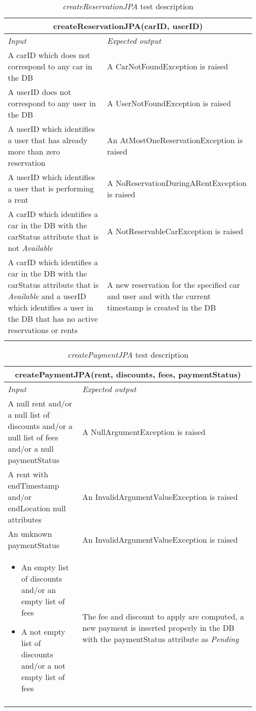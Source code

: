 \begin{longtable}{p{0.4\linewidth}p{0.6\linewidth}}
\multicolumn{2}{c}{\textbf{createReservationJPA(carID, userID)}} \\
\toprule
\emph{Input} & \emph{Expected output} \\
\midrule
A carID which does not correspond to any car in the DB & A CarNotFoundException is raised \\
\midrule
A userID does not correspond to any user in the DB & A UserNotFoundException is raised \\
\midrule
A userID which identifies a user that has already more than zero reservation & An AtMostOneReservationException is raised \\
\midrule
A userID which identifies a user that is performing a rent & A NoReservationDuringARentException is raised \\
\midrule
A carID which identifies a car in the DB with the carStatus attribute that is not \emph{Available} & A NotReservableCarException is raised \\
\midrule
A carID which identifies a car in the DB with the carStatus attribute that is \emph{Available} and a userID which identifies a user in the DB that has no active reservations or rents & A new reservation for the specified car and user and with the current timestamp is created in the DB\\
\bottomrule
\caption{\emph{createReservationJPA} test description}
\end{longtable}

\begin{longtable}{p{0.3\linewidth}p{0.7\linewidth}}
\multicolumn{2}{c}{\textbf{createPaymentJPA(rent, discounts, fees, paymentStatus)}} \\
\toprule
\emph{Input} & \emph{Expected output} \\
\midrule
A null rent and/or a null list of discounts and/or a null list of fees and/or a null paymentStatus & A NullArgumentException is raised\\
\midrule
A rent with endTimestamp and/or endLocation null attributes & An InvalidArgumentValueException is raised \\
\midrule
An unknown paymentStatus & An InvalidArgumentValueException is raised \\
\midrule
\begin{itemize}
\item An empty list of discounts and/or an empty list of fees
\item A not empty list of discounts and/or a not empty list of fees
\end{itemize} & The fee and discount to apply are computed, a new payment is inserted properly in the DB with the paymentStatus attribute as \emph{Pending}\\
\bottomrule
\caption{\emph{createPaymentJPA} test description}
\end{longtable}


